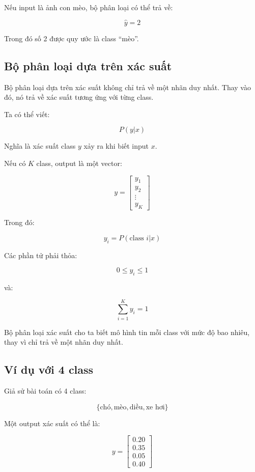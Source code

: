 \begin{vidu}
Nếu input là ảnh con mèo, bộ phân loại có thể trả về:

\[
    \hat{y}=2
\]

Trong đó số 2 được quy ước là class ``mèo''.
\end{vidu}

\subsection{Bộ phân loại dựa trên xác suất}

Bộ phân loại dựa trên xác suất không chỉ trả về một nhãn duy nhất. Thay vào đó, nó trả về xác suất tương ứng với từng class.

Ta có thể viết:

\[
    P(y|x)
\]

Nghĩa là xác suất class $y$ xảy ra khi biết input $x$.

Nếu có $K$ class, output là một vector:

\[
    y =
    \begin{bmatrix}
    y_1\\
    y_2\\
    \vdots\\
    y_K
    \end{bmatrix}
\]

Trong đó:

\[
    y_i = P(\text{class } i | x)
\]

Các phần tử phải thỏa:

\[
    0 \leq y_i \leq 1
\]

và:

\[
    \sum_{i=1}^{K} y_i = 1
\]

\begin{ghinho}
Bộ phân loại xác suất cho ta biết mô hình tin mỗi class với mức độ bao nhiêu, thay vì chỉ trả về một nhãn duy nhất.
\end{ghinho}

\subsection{Ví dụ với 4 class}

Giả sử bài toán có 4 class:

\[
    \{\text{chó}, \text{mèo}, \text{diều}, \text{xe hơi}\}
\]

Một output xác suất có thể là:

\[
    y =
    \begin{bmatrix}
    0.20\\
    0.35\\
    0.05\\
    0.40
    \end{bmatrix}
\]

